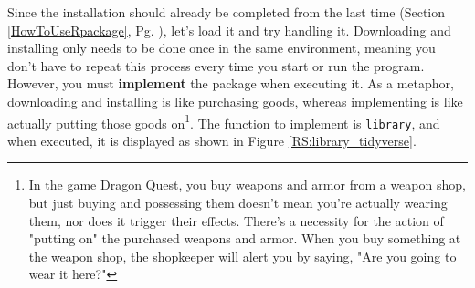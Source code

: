 \documentclass{ltjsbook}
\begin{document}
Since the installation should already be completed from the last time (Section \ref{HowToUseRpackage}, Pg. \pageref{HowToUseRpackage}), let's load it and try handling it.
Downloading and installing only needs to be done once in the same environment, meaning you don't have to repeat this process every time you start or run the program. However, you must \textbf{implement} the package when executing it. As a metaphor, downloading and installing is like purchasing goods, whereas implementing is like actually putting those goods on\footnote{In the game Dragon Quest, you buy weapons and armor from a weapon shop, but just buying and possessing them doesn't mean you're actually wearing them, nor does it trigger their effects. There's a necessity for the action of "putting on" the purchased weapons and armor. When you buy something at the weapon shop, the shopkeeper will alert you by saying, "Are you going to wear it here?"}.
The function to implement is \verb|library|, and when executed, it is displayed as shown in Figure \ref{RS:library_tidyverse}.
\end{document}
